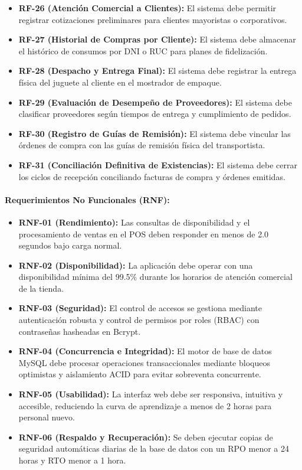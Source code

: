 \documentclass[12pt,a4paper]{article}
\begin{document}
\begin{itemize}
  \item \textbf{RF-26 (Atención Comercial a Clientes):} El sistema debe permitir registrar cotizaciones preliminares para clientes mayoristas o corporativos.
  \item \textbf{RF-27 (Historial de Compras por Cliente):} El sistema debe almacenar el histórico de consumos por DNI o RUC para planes de fidelización.
  \item \textbf{RF-28 (Despacho y Entrega Final):} El sistema debe registrar la entrega física del juguete al cliente en el mostrador de empaque.
  \item \textbf{RF-29 (Evaluación de Desempeño de Proveedores):} El sistema debe clasificar proveedores según tiempos de entrega y cumplimiento de pedidos.
  \item \textbf{RF-30 (Registro de Guías de Remisión):} El sistema debe vincular las órdenes de compra con las guías de remisión física del transportista.
  \item \textbf{RF-31 (Conciliación Definitiva de Existencias):} El sistema debe cerrar los ciclos de recepción conciliando facturas de compra y órdenes emitidas.
\end{itemize}

\paragraph{Requerimientos No Funcionales (RNF):}

\begin{itemize}
  \item \textbf{RNF-01 (Rendimiento):} Las consultas de disponibilidad y el procesamiento de ventas en el POS deben responder en menos de 2.0 segundos bajo carga normal.
  \item \textbf{RNF-02 (Disponibilidad):} La aplicación debe operar con una disponibilidad mínima del 99.5\% durante los horarios de atención comercial de la tienda.
  \item \textbf{RNF-03 (Seguridad):} El control de accesos se gestiona mediante autenticación robusta y control de permisos por roles (RBAC) con contraseñas hasheadas en Bcrypt.
  \item \textbf{RNF-04 (Concurrencia e Integridad):} El motor de base de datos MySQL debe procesar operaciones transaccionales mediante bloqueos optimistas y aislamiento ACID para evitar sobreventa concurrente.
  \item \textbf{RNF-05 (Usabilidad):} La interfaz web debe ser responsiva, intuitiva y accesible, reduciendo la curva de aprendizaje a menos de 2 horas para personal nuevo.
  \item \textbf{RNF-06 (Respaldo y Recuperación):} Se deben ejecutar copias de seguridad automáticas diarias de la base de datos con un RPO menor a 24 horas y RTO menor a 1 hora.
\end{itemize}
\end{document}
